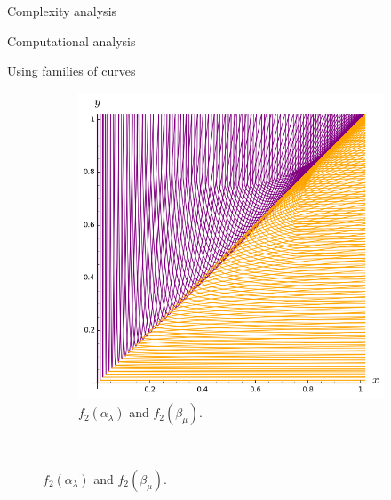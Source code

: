 \documentclass[11pt, a4paper, english, twoside, notitlepage, openright]{report}
\begin{document}
\begin{chapter}{Complexity analysis}
\begin{section}{Computational analysis}
\begin{subsection}{Using families of curves}
\begin{figure}
\begin{subfigure}{.45\linewidth}
\includegraphics[width=1\textwidth]{plots/ch5_30_3curves4.png}
\vspace{-0.4cm}\caption{$f_2(\alpha_{\lambda})$ and $f_2(\beta_{\mu})$.\label{fig:3curves2}}
\end{subfigure}\\[1ex]
\vspace{-0.2cm}


\end{figure}
\end{subsection}
\end{section}
\end{chapter}
\end{document}
